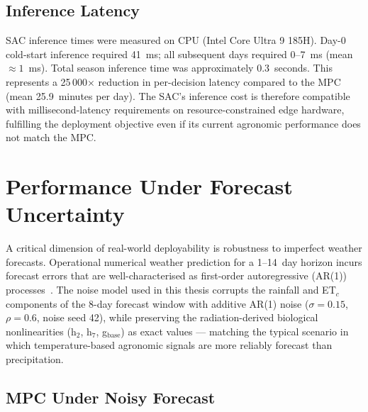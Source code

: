 \subsection{Inference Latency}

SAC inference times were measured on CPU (Intel Core Ultra 9 185H).
Day-0 cold-start inference required 41~ms; all subsequent days required 0--7~ms
(mean $\approx 1$~ms).
Total season inference time was approximately 0.3~seconds.
This represents a 25\,000$\times$ reduction in per-decision latency compared to the
MPC (mean 25.9~minutes per day).  The SAC's inference cost is therefore compatible
with millisecond-latency requirements on resource-constrained edge hardware, fulfilling
the deployment objective even if its current agronomic performance does not match
the MPC.

\section{Performance Under Forecast Uncertainty}
\label{sec:noise}

A critical dimension of real-world deployability is robustness to imperfect weather
forecasts.  Operational numerical weather prediction for a 1--14~day horizon incurs
forecast errors that are well-characterised as first-order autoregressive (AR(1))
processes~\cite{murphy1988skill}.
The noise model used in this thesis corrupts the rainfall and ET$_c$ components of the
8-day forecast window with additive AR(1) noise
($\sigma = 0.15$, $\rho = 0.6$, noise seed 42), while preserving the radiation-derived
biological nonlinearities (h$_2$, h$_7$, g$_{\mathrm{base}}$) as exact values — matching
the typical scenario in which temperature-based agronomic signals are more reliably
forecast than precipitation.

\subsection{MPC Under Noisy Forecast}


